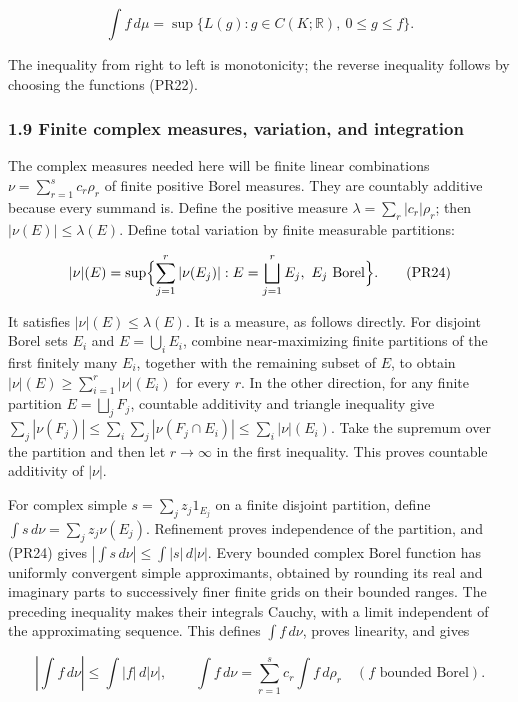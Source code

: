 \documentclass[
  11pt,
]{article}
\begin{document}
\[
\int f\,d\mu
=\sup\{L(g):g\in C(K;\mathbb R),\ 0\leq g\leq f\}.
\tag{PR23}
\]

The inequality from right to left is monotonicity; the reverse
inequality follows by choosing the functions (PR22).

\subsubsection{1.9 Finite complex measures, variation, and
integration}\label{finite-complex-measures-variation-and-integration}

The complex measures needed here will be finite linear combinations
\(\nu=\sum_{r=1}^sc_r\rho_r\) of finite positive Borel measures. They
are countably additive because every summand is. Define the positive
measure \(\lambda=\sum_r|c_r|\rho_r\); then \(|\nu(E)|\leq\lambda(E)\).
Define total variation by finite measurable partitions:

\[
|\nu|(E)=\sup\Bigl\{\sum_{j=1}^r|\nu(E_j)|:
 E=\bigsqcup_{j=1}^rE_j,\ E_j\text{ Borel}\Bigr\}.
\tag{PR24}
\]

It satisfies \(|\nu|(E)\leq\lambda(E)\). It is a measure, as follows
directly. For disjoint Borel sets \(E_i\) and \(E=\bigcup_iE_i\),
combine near-maximizing finite partitions of the first finitely many
\(E_i\), together with the remaining subset of \(E\), to obtain
\(|\nu|(E)\geq\sum_{i=1}^r|\nu|(E_i)\) for every \(r\). In the other
direction, for any finite partition \(E=\bigsqcup_jF_j\), countable
additivity and triangle inequality give
\(\sum_j|\nu(F_j)|\leq\sum_i\sum_j|\nu(F_j\cap E_i)|\leq\sum_i|\nu|(E_i)\).
Take the supremum over the partition and then let \(r\to\infty\) in the
first inequality. This proves countable additivity of \(|\nu|\).

For complex simple \(s=\sum_jz_j1_{E_j}\) on a finite disjoint
partition, define \(\int s\,d\nu=\sum_jz_j\nu(E_j)\). Refinement proves
independence of the partition, and (PR24) gives
\(|\int s\,d\nu|\leq\int|s|\,d|\nu|\). Every bounded complex Borel
function has uniformly convergent simple approximants, obtained by
rounding its real and imaginary parts to successively finer finite grids
on their bounded ranges. The preceding inequality makes their integrals
Cauchy, with a limit independent of the approximating sequence. This
defines \(\int f\,d\nu\), proves linearity, and gives

\[
\left|\int f\,d\nu\right|\leq\int|f|\,d|\nu|,
\qquad
\int f\,d\nu=\sum_{r=1}^sc_r\int f\,d\rho_r
\quad(f\text{ bounded Borel}).
\tag{PR25}
\]
\end{document}
